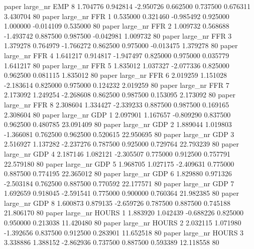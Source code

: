               paper   large_nr      EMP                 8  1.704776  0.942814  -2.950726 0.662500 0.737500  0.676311    3.430704 80
              paper   large_nr      FFR                 1  0.535000  0.321460  -0.985492 0.925000 1.000000 -0.014109    0.535000 80
              paper   large_nr      FFR                 2  1.009732  0.568688  -1.493742 0.887500 0.987500 -0.042981    1.009732 80
              paper   large_nr      FFR                 3  1.379278  0.764979  -1.766272 0.862500 0.975000 -0.013475    1.379278 80
              paper   large_nr      FFR                 4  1.641217  0.914817  -1.947497 0.825000 0.975000  0.035779    1.641217 80
              paper   large_nr      FFR                 5  1.835012  1.037327  -2.077336 0.825000 0.962500  0.081115    1.835012 80
              paper   large_nr      FFR                 6  2.019259  1.151028  -2.183614 0.825000 0.975000  0.124232    2.019259 80
              paper   large_nr      FFR                 7  2.173092  1.249254  -2.268608 0.862500 0.987500  0.153095    2.173092 80
              paper   large_nr      FFR                 8  2.308604  1.334427  -2.339233 0.887500 0.987500  0.169165    2.308604 80
              paper   large_nr      GDP                 1  2.097901  1.167657  -0.809290 0.837500 0.962500  0.480785   23.091409 80
              paper   large_nr      GDP                 2  1.889044  1.019803  -1.366081 0.762500 0.962500  0.520615   22.950695 80
              paper   large_nr      GDP                 3  2.516927  1.137282  -2.237276 0.787500 0.925000  0.729764   22.793239 80
              paper   large_nr      GDP                 4  2.187146  1.082121  -2.305507 0.775000 0.912500  0.757791   22.579180 80
              paper   large_nr      GDP                 5  1.968705  1.027175  -2.409631 0.775000 0.887500  0.774195   22.365012 80
              paper   large_nr      GDP                 6  1.829880  0.971326  -2.503184 0.762500 0.887500  0.770592   22.177571 80
              paper   large_nr      GDP                 7  1.692659  0.918045  -2.591541 0.775000 0.900000  0.760364   21.982385 80
              paper   large_nr      GDP                 8  1.600873  0.879135  -2.659726 0.787500 0.887500  0.745188   21.806170 80
              paper   large_nr    HOURS                 1  1.883920  1.042439  -0.688226 0.825000 0.950000  0.213038   11.420480 80
              paper   large_nr    HOURS                 2  2.032115  1.071980  -1.392656 0.837500 0.912500  0.283901   11.652518 80
              paper   large_nr    HOURS                 3  3.338886  1.388152  -2.862936 0.737500 0.887500  0.593389   12.118558 80

